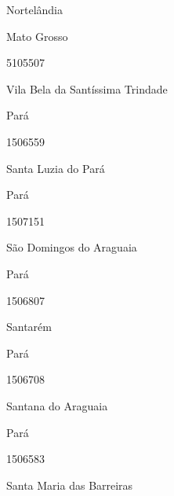 \documentclass[
  letterpaper,
]{report}
\begin{document}
\n      

Nortelândia

\n    

\n    

\n      

Mato Grosso

\n      

5105507

\n      

Vila Bela da Santíssima Trindade

\n    

\n    

\n      

Pará

\n      

1506559

\n      

Santa Luzia do Pará

\n    

\n    

\n      

Pará

\n      

1507151

\n      

São Domingos do Araguaia

\n    

\n    

\n      

Pará

\n      

1506807

\n      

Santarém

\n    

\n    

\n      

Pará

\n      

1506708

\n      

Santana do Araguaia

\n    

\n    

\n      

Pará

\n      

1506583

\n      

Santa Maria das Barreiras

\n    

\n    
\end{document}
